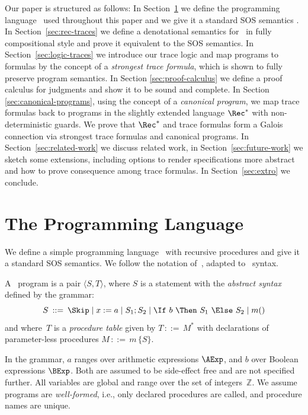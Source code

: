 \documentclass[a4paper,numberwithinsect]{lipics-v2021}
\begin{document}
Our paper is structured as follows: In Section~\ref{sec:rec} we define
the programming language \Rec\ used throughout this paper and we give
it a standard SOS semantics \cite{Plotkin04}. In
Section~\ref{sec:rec-traces} we define a denotational semantics for
\Rec\ in fully compositional style and prove it equivalent to the SOS
semantics. In Section~\ref{sec:logic-traces} we introduce our trace
logic and map programs to formulas by the concept of a \emph{strongest
  trace formula}, which is shown to fully preserve program
semantics. In Section \ref{sec:proof-calculus} we define a proof
calculus for judgments and show it to be sound and complete. In
Section \ref{sec:canonical-programs}, using the concept of a
\emph{canonical program}, we map trace formulas back to programs in
the slightly extended language $\Rec^\ast$ with non-deterministic
guards.  We prove that $\Rec^\ast$ and trace formulas form a Galois
connection via strongest trace formulas and canonical programs. In
Section~\ref{sec:related-work} we discuss related work, in
Section~\ref{sec:future-work} we sketch some extensions, including
options to render specifications more abstract and how to prove
consequence among trace formulas. In Section~\ref{sec:extro} we
conclude.


\section{The Programming Language \Rec}
\label{sec:rec}

We define a simple programming language \Rec\ with recursive
procedures and give it a standard SOS semantics.  We follow the
notation of~\cite{nie-nie-07-book}, adapted to \Rec\ syntax.
%
\begin{definition}
  \label{def:rec-syntax}
  A \Rec\ program is a pair $\langle S, T\rangle$, where $S$ is a
  statement with the \emph{abstract syntax} defined by the grammar:
  $$
  S \>::=\> \Skip \mid 
  x := a \mid 
  S_1 ; S_2 \mid 
  \If\ b\ \Then\ S_1\ \Else\ S_2 \mid 
  m()
  $$
  and where~$T$ is a \emph{procedure table} given by $T\,::=\,M^\ast$ with
  declarations of parameter-less procedures $M\,::=\,m\,\{S\}$.

  In the grammar, $a$ ranges over arithmetic expressions $\AExp$, and
  $b$ over Boolean expressions $\BExp$. Both are assumed to be
  side-effect free and are not specified further. All variables are
  global and range over the set of integers~$\mathbb{Z}$. We assume
  programs are \emph{well-formed}, i.e., only declared procedures are
  called, and procedure names are unique.
\end{definition}
\end{document}
